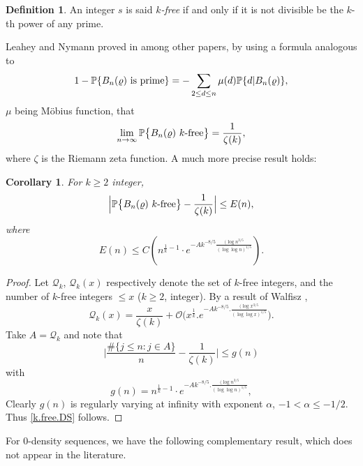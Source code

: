 \documentclass[11pt,draft,reqno]{amsart}
\newtheorem{corollary}[theorem]{Corollary}
\theoremstyle{definition}
\newtheorem{definition}[theorem]{Definition}
\theoremstyle{remarks}
\numberwithin{equation}{section}
\def \a{{\alpha}}
\def \m{{\mu}}
\def\P{{\mathcal P}}
\def\P{{\mathbb P}}
\begin{document}
 \begin{definition}An integer $s$ is said {\it $k$-free} if and only if it is not divisible be the $k$-th power of any prime. 
 \end{definition}Leahey and Nymann proved in \cite{LN}  among other papers, by using a formula analogous to 
    \begin{equation*}
    1-\P\{ B_n(\varrho)\ \hbox{is prime}\}= - \sum_{2\le d\le n }  \m(d) \P\{ d|B_n(\varrho)\},  
\end{equation*}  $\m$ being M\"obius function, that
\begin{equation}\label{Bnprime}   
\lim_{n\to \infty}\P\big\{ B_n(\varrho)\ k\hbox{-{\rm free}}\big\}= \frac{1} {\zeta(k)},\end{equation}    where $\zeta$ is the Riemann zeta function.
       A much more precise result holds:
\begin{corollary}  {\it For $k\ge 2$ integer,}
 \begin{equation}\label{k.free.DS} \Big|\P\big\{ B_n(\varrho)\ k\hbox{-{\rm free}}\big\}  - \frac{1}{\zeta(k)} \Big|\le E(n) , 
\end{equation}
where
$$ E(n)\le C\left( n^{\frac1k-1}\cdot  e^{ -Ak^{-8/5}\frac{(\log 
n^{{3/5}}}{(\log\log  n) ^{1/5}}}\right).$$
\end{corollary} 
\begin{proof} Let ${\mathcal Q}_k$,  ${\mathcal Q}_k(x)$ respectively denote the set of $k$-free integers, and the number of $k$-free integers $\le x$ ($k\ge 2$, integer).  By a result of Walfisz \cite{Wal},
  \begin{equation}\label{k.free} 
{\mathcal Q}_k (x)= 
\frac{x}{\zeta(k)} + {\mathcal  O} 
\big( x^{\frac1k}. e^{ -Ak^{-8/5}.\frac{(\log 
x^{{3/5}}}{(\log\log  x) ^{1/5}}}\big)
 . 
\end{equation}
Take $A= {\mathcal Q}_k$  and note that 
$$\Big|\frac{\#\{ j\le n: j\in A\}}{n}- \frac{1}{\zeta(k)} \Big|\le g(n)$$
with 
$$g(n)= n^{\frac1k-1}\cdot e^{ -Ak^{-8/5}.\frac{(\log 
n^{{3/5}}}{(\log\log  n) ^{1/5}}},$$
Clearly $g(n)$   is regularly varying at infinity with exponent $\a$, $-1<\a\le -1/2$. Thus \eqref{k.free.DS} follows.
\end{proof}
 \medskip\par
  For $0$-density sequences, we have the following complementary result, which does not appear  in the literature.
\end{document}
